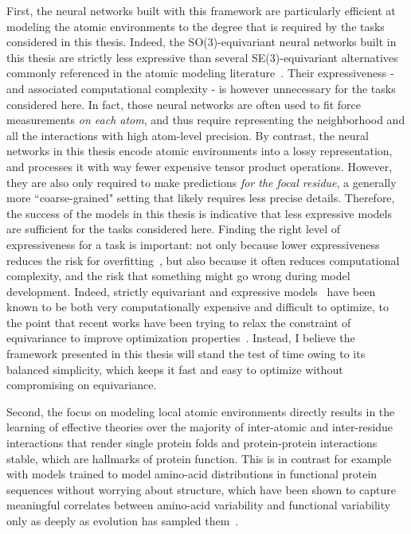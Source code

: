 First, the neural networks built with this framework are particularly efficient at modeling the atomic environments
to the degree that is required by the tasks considered in this thesis.
Indeed, the SO(3)-equivariant neural networks built in this thesis are strictly less expressive than several SE(3)-equivariant
alternatives commonly referenced in the atomic modeling literature~\citep{batzner_e3-equivariant_2022, liao_equiformer_2022, thomas_tensor_2018}.
Their expressiveness - and associated computational complexity - is however unnecessary for the tasks considered here.
In fact, those neural networks are often used to fit force measurements \textit{on each atom}, and thus require representing the neighborhood
and all the interactions with high atom-level precision.
By contrast, the neural networks in this thesis encode atomic environments into a lossy representation, and processes it with way fewer
expensive tensor product operations.
However, they are also only required to make predictions \textit{for the focal residue}, a generally more ``coarse-grained" setting
that likely requires less precise details.
Therefore, the success of the models in this thesis is indicative that less expressive models are sufficient for the tasks considered here.
Finding the right level of expressiveness for a task is important:
not only because lower expressiveness reduces the risk for overfitting~\citep{bishop_pattern_2006},
but also because it often reduces computational complexity, and the risk that something might go wrong during model development.
Indeed, strictly equivariant and expressive models~\citep{batzner_e3-equivariant_2022, liao_equiformer_2022, thomas_tensor_2018}
have been known to be both very computationally expensive and difficult to optimize, to the point that recent works
have been trying to relax the constraint of equivariance to improve optimization properties~\citep{pertigkiozoglou_recurrent_2026}.
Instead, I believe the framework presented in this thesis will stand the test of time owing to its balanced simplicity,
which keeps it fast and easy to optimize without compromising on equivariance.

Second, the focus on modeling local atomic environments directly results in the learning of effective theories over the majority of inter-atomic
and inter-residue interactions that render single protein folds and protein-protein interactions stable, which are hallmarks of protein function.
This is in contrast for example with models trained to model amino-acid distributions in functional protein sequences without worrying about structure,
which have been shown to capture meaningful correlates between amino-acid variability and functional variability only as deeply as evolution has sampled them~\citep{zhang_protein_2024}.

